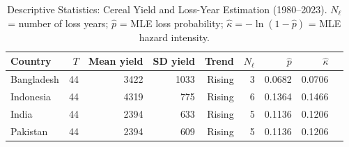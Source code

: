 \begin{table}
\caption{Descriptive Statistics: Cereal Yield and Loss-Year Estimation (1980--2023). $N_\ell$ = number of loss years; $\hat{p}$ = MLE loss probability; $\hat{\kappa}=-\ln(1-\hat{p})$ = MLE hazard intensity.}
\label{tab:descriptive}
\begin{tabular}{lrrrrrrrr}
\toprule
Country & $T$ & Mean yield & SD yield & Trend & $N_\ell$ & $\hat{p}$ & $\hat{\kappa}$ \\
\midrule
Bangladesh & 44 & 3422 & 1033 & Rising & 3 & 0.0682 & 0.0706 \\
Indonesia & 44 & 4319 & 775 & Rising & 6 & 0.1364 & 0.1466 \\
India & 44 & 2394 & 633 & Rising & 5 & 0.1136 & 0.1206 \\
Pakistan & 44 & 2394 & 609 & Rising & 5 & 0.1136 & 0.1206 \\
\bottomrule
\end{tabular}
\end{table}
